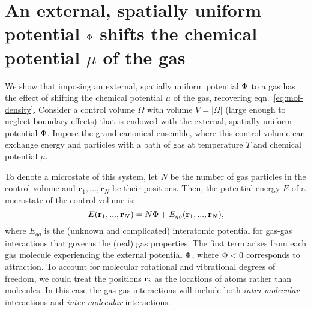 \setcounter{table}{0}
\renewcommand{\thetable}{S\arabic{table}}%
\setcounter{figure}{0}
\renewcommand{\thefigure}{S\arabic{figure}}%
\renewcommand{\thesection}{SI \Alph{section}}%

\section{An external, spatially uniform potential $\Phi$ shifts the chemical potential $\mu$ of the gas} \label{sec:V_shifts_chem_pot}
We show that imposing an external, spatially uniform potential $\Phi$ to a gas
has the effect of shifting the chemical potential $\mu$ of the gas, recovering
eqn.~\ref{eq:mof-density}. Consider a control volume $\Omega$ with volume
$V=|\Omega|$ (large enough to neglect boundary effects) that is endowed with
the external, spatially uniform potential $\Phi$. Impose the grand-canonical
ensemble, where this control volume can exchange energy and particles with a
bath of gas at temperature $T$ and chemical potential $\mu$.

To denote a microstate of this system, let $N$ be the number of gas particles
in the control volume and $\mathbf{r}_1,...,\mathbf{r}_N$ be their positions.
Then, the potential energy $E$ of a microstate of the control volume is:
\begin{equation} E(\mathbf{r}_1,...,\mathbf{r}_N) = N\Phi +
E_{gg}(\mathbf{r}_1,...,\mathbf{r}_N), \end{equation} where $E_{gg}$ is the
(unknown and complicated) interatomic potential for gas-gas
interactions that governs the (real) gas properties. The first term
arises from each gas molecule experiencing the external potential
$\Phi$, where $\Phi < 0$ corresponds to attraction.  To account
  for molecular rotational and vibrational degrees of freedom, we
  could treat the positions $\mathbf{r}_i$ as the locations of atoms rather
  than molecules.  In this case the gas-gas interactions will include
  both \emph{intra-molecular} interactions and \emph{inter-molecular}
  interactions.


